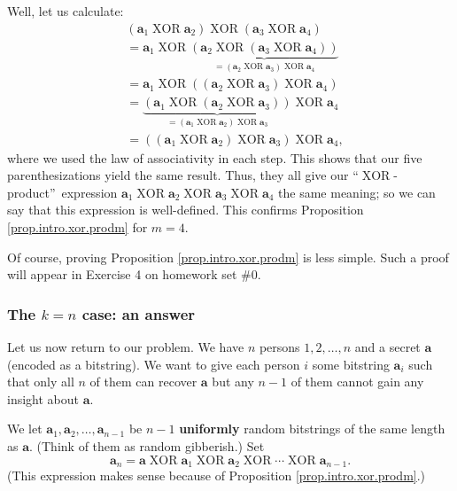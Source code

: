 \documentclass[numbers=enddot,12pt,final,onecolumn,notitlepage]{scrartcl}%
\numberwithin{exer}{subsection}
\theoremstyle{definition}
\begin{document}
Well, let us calculate:%
\begin{align*}
&  \left(  \mathbf{a}_{1}\operatorname*{XOR}\mathbf{a}_{2}\right)
\operatorname*{XOR}\left(  \mathbf{a}_{3}\operatorname*{XOR}\mathbf{a}%
_{4}\right) \\
&  =\mathbf{a}_{1}\operatorname*{XOR}\underbrace{\left(  \mathbf{a}%
_{2}\operatorname*{XOR}\left(  \mathbf{a}_{3}\operatorname*{XOR}\mathbf{a}%
_{4}\right)  \right)  }_{=\left(  \mathbf{a}_{2}\operatorname*{XOR}%
\mathbf{a}_{3}\right)  \operatorname*{XOR}\mathbf{a}_{4}}\\
&  =\mathbf{a}_{1}\operatorname*{XOR}\left(  \left(  \mathbf{a}_{2}%
\operatorname*{XOR}\mathbf{a}_{3}\right)  \operatorname*{XOR}\mathbf{a}%
_{4}\right) \\
&  =\underbrace{\left(  \mathbf{a}_{1}\operatorname*{XOR}\left(
\mathbf{a}_{2}\operatorname*{XOR}\mathbf{a}_{3}\right)  \right)  }_{=\left(
\mathbf{a}_{1}\operatorname*{XOR}\mathbf{a}_{2}\right)  \operatorname*{XOR}%
\mathbf{a}_{3}}\operatorname*{XOR}\mathbf{a}_{4}\\
&  =\left(  \left(  \mathbf{a}_{1}\operatorname*{XOR}\mathbf{a}_{2}\right)
\operatorname*{XOR}\mathbf{a}_{3}\right)  \operatorname*{XOR}\mathbf{a}_{4},
\end{align*}
where we used the law of associativity in each step. This shows that our five
parenthesizations yield the same result. Thus, they all give our
\textquotedblleft$\operatorname*{XOR}$-product\textquotedblright\ expression
$\mathbf{a}_{1}\operatorname*{XOR}\mathbf{a}_{2}\operatorname*{XOR}%
\mathbf{a}_{3}\operatorname*{XOR}\mathbf{a}_{4}$ the same meaning; so we can
say that this expression is well-defined. This confirms Proposition
\ref{prop.intro.xor.prodm} for $m=4$.

Of course, proving Proposition \ref{prop.intro.xor.prodm} is less simple. Such
a proof will appear in Exercise 4 on homework set \#0.

\subsubsection{The $k=n$ case: an answer}

Let us now return to our problem. We have $n$ persons $1,2,\ldots,n$ and a
secret $\mathbf{a}$ (encoded as a bitstring). We want to give each person $i$
some bitstring $\mathbf{a}_{i}$ such that only all $n$ of them can recover
$\mathbf{a}$ but any $n-1$ of them cannot gain any insight about $\mathbf{a}$.

We let $\mathbf{a}_{1},\mathbf{a}_{2},\ldots,\mathbf{a}_{n-1}$ be $n-1$
\textbf{uniformly} random bitstrings of the same length as $\mathbf{a}$.
(Think of them as random gibberish.) Set%
\[
\mathbf{a}_{n}=\mathbf{a}\operatorname*{XOR}\mathbf{a}_{1}\operatorname*{XOR}%
\mathbf{a}_{2}\operatorname*{XOR}\cdots\operatorname*{XOR}\mathbf{a}_{n-1}.
\]
(This expression makes sense because of Proposition \ref{prop.intro.xor.prodm}.)
\end{document}
